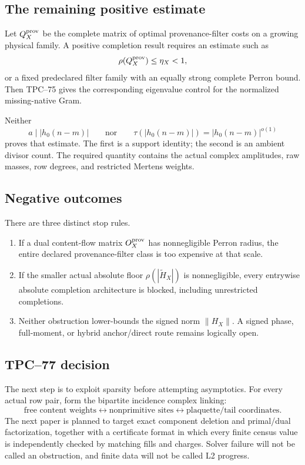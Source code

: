 \subsection{The remaining positive estimate}

Let \(Q^{\rm prov}_X\) be the complete matrix of optimal
provenance-filter costs on a growing physical family.  A positive
completion result requires an estimate such as
\[
 \rho(Q^{\rm prov}_X)\le\eta_X<1,
\]
or a fixed predeclared filter family with an equally strong complete
Perron bound.  Then TPC--75 gives the corresponding eigenvalue control
for the normalized missing-native Gram.

Neither
\[
 a\mid|h_0(n-m)|
 \qquad\text{nor}\qquad
 \tau(|h_0(n-m)|)=|h_0(n-m)|^{o(1)}
\]
proves that estimate.  The first is a support identity; the second is an
ambient divisor count.  The required quantity contains the actual
complex amplitudes, raw masses, row degrees, and restricted Mertens
weights.

\subsection{Negative outcomes}

There are three distinct stop rules.
\begin{enumerate}[label=\textup{(G\arabic*)},leftmargin=3.2em]
 \item If a dual content-flow matrix
       \(O_X^{\rm prov}\) has nonnegligible Perron radius, the entire
       declared provenance-filter class is too expensive at that scale.
 \item If the smaller actual absolute floor
       \(\rho(|\widetilde H_X|)\) is nonnegligible, every entrywise
       absolute completion architecture is blocked, including
       unrestricted completions.
 \item Neither obstruction lower-bounds the signed norm
       \(\|H_X\|\).  A signed phase, full-moment, or hybrid anchor/direct
       route remains logically open.
\end{enumerate}

\subsection{TPC--77 decision}

The next step is to exploit sparsity before attempting asymptotics.
For every actual row pair, form the bipartite incidence complex linking:
\[
 \text{free content weights}
 \longleftrightarrow
 \text{nonprimitive sites}
 \longleftrightarrow
 \text{plaquette/tail coordinates}.
\]
The next paper is planned to target exact component deletion and
primal/dual factorization, together with a certificate format in which
every finite census value is independently checked by matching fills and
charges.  Solver failure will not be called an obstruction, and finite
data will not be called L2 progress.

